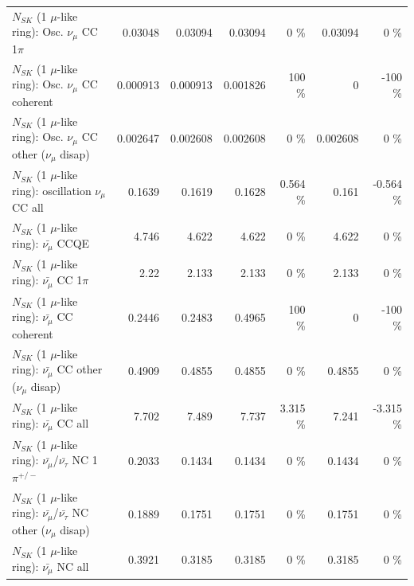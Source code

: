 \begin{table}
\begin{tabular}{| l | r | r | r  r | r  r |}
                          $N_{SK}$ (1 $\mu$-like ring): Osc. $\nu_\mu$ CC 1$\pi$ &         0.03048 &         0.03094 &         0.03094 &        0 \%  &         0.03094 &        0 \%  \\ 
                        $N_{SK}$ (1 $\mu$-like ring): Osc. $\nu_\mu$ CC coherent &        0.000913 &        0.000913 &        0.001826 &      100 \%  &               0 &     -100 \%  \\ 
         $N_{SK}$ (1 $\mu$-like ring): Osc. $\nu_\mu$ CC other ($\nu_\mu$ disap) &        0.002647 &        0.002608 &        0.002608 &        0 \%  &        0.002608 &        0 \%  \\ 
                      $N_{SK}$ (1 $\mu$-like ring): oscillation $\nu_\mu$ CC all &          0.1639 &          0.1619 &          0.1628 &    0.564 \%  &           0.161 &   -0.564 \%  \\ 
\hline
\hline
                              $N_{SK}$ (1 $\mu$-like ring): $\bar{\nu_\mu}$ CCQE &           4.746 &           4.622 &           4.622 &        0 \%  &           4.622 &        0 \%  \\ 
                         $N_{SK}$ (1 $\mu$-like ring): $\bar{\nu_\mu}$ CC 1$\pi$ &            2.22 &           2.133 &           2.133 &        0 \%  &           2.133 &        0 \%  \\ 
                       $N_{SK}$ (1 $\mu$-like ring): $\bar{\nu_\mu}$ CC coherent &          0.2446 &          0.2483 &          0.4965 &      100 \%  &               0 &     -100 \%  \\ 
        $N_{SK}$ (1 $\mu$-like ring): $\bar{\nu_\mu}$ CC other ($\nu_\mu$ disap) &          0.4909 &          0.4855 &          0.4855 &        0 \%  &          0.4855 &        0 \%  \\ 
                          $N_{SK}$ (1 $\mu$-like ring): $\bar{\nu_{\mu}}$ CC all &           7.702 &           7.489 &           7.737 &    3.315 \%  &           7.241 &   -3.315 \%  \\ 
\hline
  $N_{SK}$ (1 $\mu$-like ring): $\bar{\nu_\mu}$/$\bar{\nu_\tau}$ NC 1$\pi^{+/-}$ &          0.2033 &          0.1434 &          0.1434 &        0 \%  &          0.1434 &        0 \%  \\ 
$N_{SK}$ (1 $\mu$-like ring): $\bar{\nu_\mu}$/$\bar{\nu_\tau}$ NC other ($\nu_\mu$ disap) &          0.1889 &          0.1751 &          0.1751 &        0 \%  &          0.1751 &        0 \%  \\ 
                          $N_{SK}$ (1 $\mu$-like ring): $\bar{\nu_{\mu}}$ NC all &          0.3921 &          0.3185 &          0.3185 &        0 \%  &          0.3185 &        0 \%  \\ 

\end{tabular}
\end{table}
